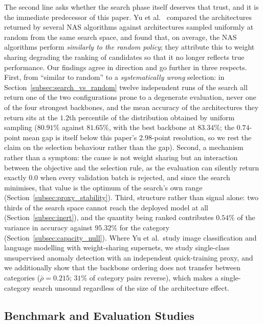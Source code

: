 The second line asks whether the search phase itself deserves that trust, and it
is the immediate predecessor of this paper. Yu et al.~\cite{yu2020evaluating}
compared the architectures returned by several NAS algorithms against
architectures sampled uniformly at random from the same search space, and found
that, on average, the NAS algorithms perform \emph{similarly to the random
policy}; they attribute this to weight sharing degrading the ranking of
candidates so that it no longer reflects true performance. Our findings agree in
direction and go further in three respects. First, from ``similar to random'' to
a \emph{systematically wrong} selection: in
Section~\ref{subsec:search_vs_random} twelve independent
runs of the search all return one of the two configurations prone to a degenerate
evaluation, never one of the four strongest backbones, and the mean accuracy of
the architectures they return sits at the
$1.2$th percentile of the distribution obtained by uniform sampling ($80.91\%$
against $81.65\%$, with the best backbone at $83.34\%$; the $0.74$-point mean gap
is itself below this paper's $2.98$-point resolution, so we rest the claim on the
selection behaviour rather than the gap). Second, a mechanism
rather than a symptom: the cause is not weight sharing but an interaction between
the objective and the selection rule, as the evaluation can silently return
exactly $0.0$ when every validation batch is rejected, and since the search
minimises, that value is the optimum of the search's own range
(Section~\ref{subsec:proxy_stability}). Third, structure rather than signal
alone: two thirds of the search space cannot reach the deployed model at all
(Section~\ref{subsec:inert}), and the quantity being ranked contributes $0.54\%$
of the variance in accuracy against $95.32\%$ for the category
(Section~\ref{subsec:capacity_null}). Where Yu et al.\ study image classification
and language modelling with weight-sharing supernets, we study single-class
unsupervised anomaly detection with an independent quick-training proxy, and we
additionally show that the backbone ordering does not transfer between categories
($\bar\rho = 0.215$; $31\%$ of category pairs reverse), which makes a
single-category search unsound regardless of the size of the architecture effect.

\subsection{Benchmark and Evaluation Studies}
\label{subsec:related_benchmark}

